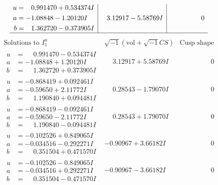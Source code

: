 \documentclass[1p]{elsarticle_modified}
\theoremstyle{definition}
\newcommand{\I}{\sqrt{-1}}
\begin{document}
$$\begin{array}{c|c|c}
\begin{aligned}
u &= \phantom{-}0.991470 + 0.534374 I \\
a &= -1.08848 - 1.20120 I \\
b &= \phantom{-}1.362720 - 0.373905 I\end{aligned}
 & \phantom{-}3.12917 - 5.58769 I & \phantom{-0.000000 } 0\\
 \hline 
 \end{array}$$\newpage$$\begin{array}{c|c|c}  
\text{Solutions to }I^u_{1}& \I (\text{vol} + \sqrt{-1}CS) & \text{Cusp shape}\\
 \hline 
\begin{aligned}
u &= \phantom{-}0.991470 - 0.534374 I \\
a &= -1.08848 + 1.20120 I \\
b &= \phantom{-}1.362720 + 0.373905 I\end{aligned}
 & \phantom{-}3.12917 + 5.58769 I & \phantom{-0.000000 } 0 \\ \hline\begin{aligned}
u &= -0.868419 + 0.092461 I \\
a &= -0.59650 + 2.11772 I \\
b &= \phantom{-}1.190840 + 0.094481 I\end{aligned}
 & \phantom{-}0.28543 - 1.79070 I & \phantom{-0.000000 } 0 \\ \hline\begin{aligned}
u &= -0.868419 - 0.092461 I \\
a &= -0.59650 - 2.11772 I \\
b &= \phantom{-}1.190840 - 0.094481 I\end{aligned}
 & \phantom{-}0.28543 + 1.79070 I & \phantom{-0.000000 } 0 \\ \hline\begin{aligned}
u &= -0.102526 + 0.849065 I \\
a &= -0.034516 - 0.292271 I \\
b &= \phantom{-}0.351504 + 0.471570 I\end{aligned}
 & -0.90967 + 3.66182 I & \phantom{-0.000000 } 0 \\ \hline\begin{aligned}
u &= -0.102526 - 0.849065 I \\
a &= -0.034516 + 0.292271 I \\
b &= \phantom{-}0.351504 - 0.471570 I\end{aligned}
 & -0.90967 - 3.66182 I & \phantom{-0.000000 } 0 \\ \hline\begin{aligned}

\end{aligned}
\end{array}$$
\end{document}

